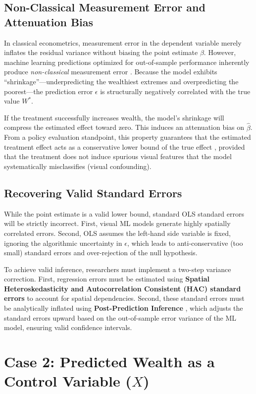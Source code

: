 \documentclass[11pt]{article}
\begin{document}
\subsection*{Non-Classical Measurement Error and Attenuation Bias}
In classical econometrics, measurement error in the dependent variable merely inflates the residual variance without biasing the point estimate $\beta$. However, machine learning predictions optimized for out-of-sample performance inherently produce \textit{non-classical} measurement error \citep{mullainathan2017machine}. Because the model exhibits ``shrinkage''---underpredicting the wealthiest extremes and overpredicting the poorest---the prediction error $\epsilon$ is structurally negatively correlated with the true value $W^*$. 

If the treatment successfully increases wealth, the model's shrinkage will compress the estimated effect toward zero. This induces an attenuation bias on $\hat{\beta}$. From a policy evaluation standpoint, this property guarantees that the estimated treatment effect acts as a conservative lower bound of the true effect \citep{mullainathan2017machine}, provided that the treatment does not induce spurious visual features that the model systematically misclassifies (visual confounding).

\subsection*{Recovering Valid Standard Errors}
While the point estimate is a valid lower bound, standard OLS standard errors will be strictly incorrect. First, visual ML models generate highly spatially correlated errors. Second, OLS assumes the left-hand side variable is fixed, ignoring the algorithmic uncertainty in $\epsilon$, which leads to anti-conservative (too small) standard errors and over-rejection of the null hypothesis.

To achieve valid inference, researchers must implement a two-step variance correction. First, regression errors must be estimated using \textbf{Spatial Heteroskedasticity and Autocorrelation Consistent (HAC) standard errors} \citep{conley1999gmm} to account for spatial dependencies. Second, these standard errors must be analytically inflated using \textbf{Post-Prediction Inference} \citep{wang2020methods}, which adjusts the standard errors upward based on the out-of-sample error variance of the ML model, ensuring valid confidence intervals.

\section{Case 2: Predicted Wealth as a Control Variable ($X$)}
\end{document}
